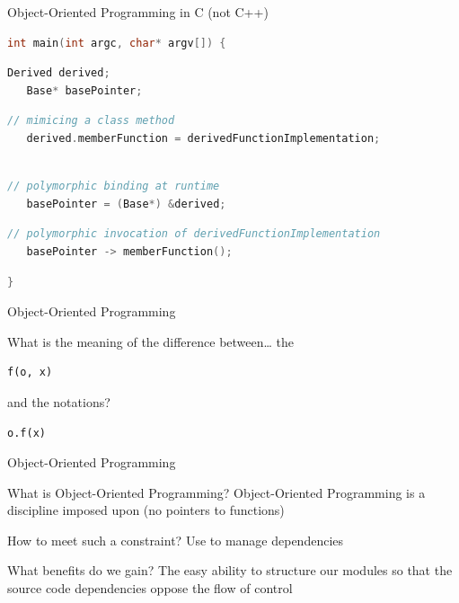 \begin{frame}[fragile]{Object-Oriented Programming in C (not C++)}
\begin{lstlisting}[language=c]
int main(int argc, char* argv[]) {
\end{lstlisting}
\begin{lstlisting}[language=c]
   Derived derived;
   Base* basePointer;

\end{lstlisting}
\begin{lstlisting}[language=c]
   // mimicing a class method
   derived.memberFunction = derivedFunctionImplementation;
   
\end{lstlisting}
\begin{lstlisting}[language=c]
   // polymorphic binding at runtime
   basePointer = (Base*) &derived;

\end{lstlisting}
\begin{lstlisting}[language=c]
   // polymorphic invocation of derivedFunctionImplementation
   basePointer -> memberFunction();
\end{lstlisting}
\begin{lstlisting}[language=c]
}
\end{lstlisting}
\end{frame}

\begin{frame}[fragile]{Object-Oriented Programming}
\begin{block}{What is the meaning of the difference between\ldots}
the \\
\begin{lstlisting}
f(o, x)
\end{lstlisting}
and the  notations?
\begin{lstlisting}
o.f(x)
\end{lstlisting}
\end{block}
\end{frame}


\begin{frame}{Object-Oriented Programming}
\begin{block}{What is Object-Oriented Programming?}
Object-Oriented Programming is a discipline imposed upon  (no pointers to functions)
\end{block}
\pause
\begin{block}{How to meet such a constraint?}
Use  to manage dependencies
\end{block}
\pause
\begin{block}{What benefits do we gain?}
The easy ability to structure our modules so that the source code dependencies
oppose the flow of control
\end{block}
\end{frame}

